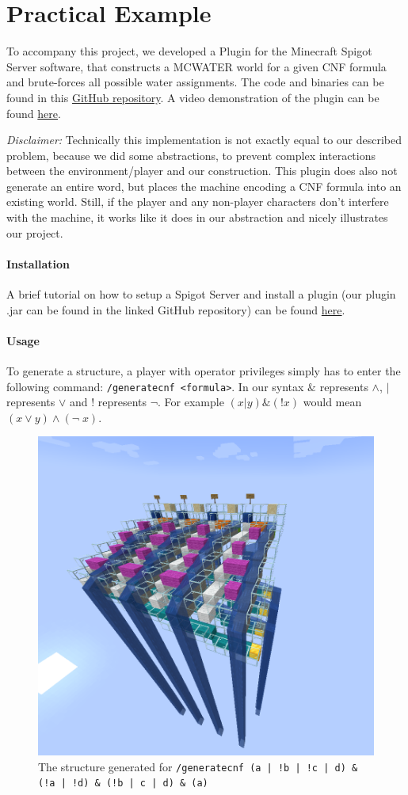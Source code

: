 \section{Practical Example}


To accompany this project, we developed a Plugin for the Minecraft Spigot Server software, that constructs a MCWATER world for a given CNF formula and brute-forces all possible water assignments. The code and binaries can be found in this \href{https://github.com/JonathanDotExe/minecraft-water-problem}{GitHub repository}. A video demonstration of the plugin can be found \href{https://youtube.com}{here}.

\emph{Disclaimer: } Technically this implementation is not exactly equal to our described problem, because we did some abstractions, to prevent complex interactions between the environment/player and our construction. This plugin does also not generate an entire word, but places the machine encoding a CNF formula into an existing world. Still, if the player and any non-player characters don't interfere with the machine, it works like it does in our abstraction and nicely illustrates our project.

\paragraph{Installation}
A brief tutorial on how to setup a Spigot Server and install a plugin (our plugin .jar can be found in the linked GitHub repository) can be found \href{https://www.spigotmc.org/wiki/spigot-installation/}{here}.

\paragraph{Usage}
To generate a structure, a player with operator privileges simply has to enter the following command: \verb|/generatecnf <formula>|. In our syntax $\&$ represents $\wedge$, $\vert$ represents $\vee$ and ! represents $\neg$. For example $(x | y) \& (!x)$ would mean $(x \vee y) \wedge (\neg \; x)$.

\begin{figure}[h]
    \centering
    \includegraphics[width=.5\linewidth]{images/big_example.png}
    \cprotect\caption{The structure generated for \verb+/generatecnf (a | !b | !c | d) & (!a | !d) & (!b | c | d) & (a)+}
    \label{fig:small-example}
\end{figure}

